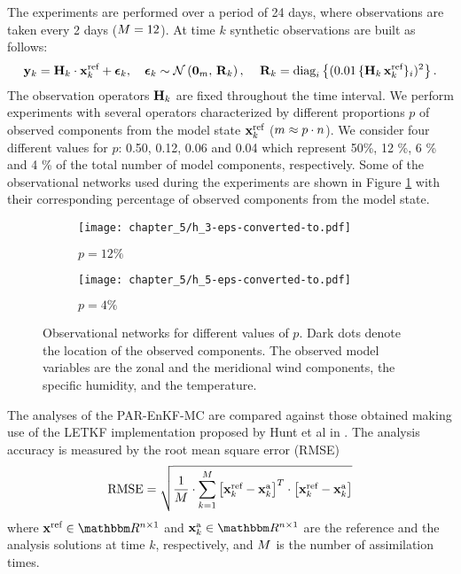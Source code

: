 \documentclass[12pt]{article}
\newcommand{\zeros}{{\bf 0}}
\begin{document}
The experiments are performed over a period of 24 days, where observations are taken every 2 days ($M=12$). At time $k$ synthetic observations are built as follows:
\begin{eqnarray*}
\y_k = \H_k \cdot \x^\textnormal{ref}_k + \errobs_k, \quad \errobs_k \sim \Nor \lp \zeros_{\Nobs},\, \R_k \rp,\,
\quad \R_k = \textnormal{diag}_{i}\left\{ (0.01\, \{\H_k \, \x^\textnormal{ref}_k\}_i )^2  \right\}.
\end{eqnarray*}
The observation operators ${\bf H}_k$ are fixed throughout the time interval. We perform experiments with several operators characterized by different  proportions $p$ of observed components from the model state ${\bf x}^\textnormal{ref}_k$ ($m \approx p \cdot n$). We consider four different values for $p$: 0.50, 0.12, 0.06 and 0.04 which represent 50\%, 12 \%, 6 \% and 4 \% of the total number of model components, respectively. Some of the observational networks used during the experiments are shown in Figure \ref{fig:exp-observational-grids} with their corresponding percentage of observed components from the model state. 
\begin{figure}[H]
\centering
\begin{subfigure}{0.5\textwidth}
\centering
\texttt{[image: chapter\_5/h\_3-eps-converted-to.pdf]}
\caption{$p=12\%$ }
\end{subfigure}\begin{subfigure}{0.5\textwidth}
\centering
\texttt{[image: chapter\_5/h\_5-eps-converted-to.pdf]}
\caption{$p=4\%$ }
\end{subfigure}\caption{Observational networks for different values of $p$. Dark dots denote the location of the observed components. The observed model variables are the zonal and the meridional wind components, the specific humidity, and the temperature.}
\label{fig:exp-observational-grids}
\end{figure}
The analyses of the PAR-EnKF-MC are compared against those obtained making use of the LETKF implementation proposed by Hunt et al in \cite{terasaki2015local,TELA:TELA076,miyoshi2012local} . The analysis accuracy is measured by the root mean square error (RMSE)
\begin{eqnarray}
\label{eqch5:ER-RMSE-formula}
\displaystyle
\text{RMSE}  = \sqrt{\frac{1}{M} \cdot \sum_{k=1}^M \left [ {\bf x}^\textnormal{ref}_k -{\bf x}^\textnormal{a}_k \right ]^T \cdot \left [ {\bf x}^\textnormal{ref}_k -{\bf x}^\textnormal{a}_k \right ] }
\end{eqnarray}
where $\x^\textnormal{ref} \in \Re^{\Nstate \times 1}$ and $\x^\textnormal{a}_{k} \in \Re^{\Nstate \times 1}$ are the reference and the analysis solutions at time $k$, respectively, and $M$ is the number of assimilation times. 
\end{document}

